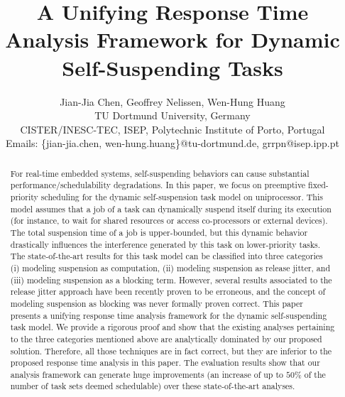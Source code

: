 \documentclass[conference]{IEEEtran}
\begin{document}
  
\title{A Unifying Response Time Analysis Framework for Dynamic Self-Suspending Tasks}

\author{Jian-Jia Chen, Geoffrey Nelissen, Wen-Hung Huang\\
 TU Dortmund University, Germany\\
 CISTER/INESC-TEC, ISEP, Polytechnic Institute of Porto, Portugal \\
Emails: \{jian-jia.chen, wen-hung.huang\}@tu-dortmund.de, grrpn@isep.ipp.pt
}

\maketitle

\begin{abstract}
  For real-time embedded systems, self-suspending behaviors can cause
  substantial performance/schedulability degradations. In this paper,
  we focus on preemptive fixed-priority scheduling for the dynamic
  self-suspension task model on uniprocessor. This
  model assumes that a job of a task can dynamically suspend itself during its execution (for instance, to wait for shared resources or access co-processors or external devices).
  The total suspension time of a job is upper-bounded, but this dynamic behavior drastically influences the interference generated by this task on lower-priority tasks. The state-of-the-art results for this task model can be classified
  into three categories (i) modeling suspension as computation, (ii)
  modeling suspension as release jitter, and (iii) modeling suspension as a blocking term.
  However, several results associated to the release jitter approach have been recently proven to be erroneous, and the concept of modeling suspension as blocking was never
  formally proven correct. This paper presents a unifying
  response time analysis framework for the dynamic self-suspending
  task model. We provide a rigorous proof and show that the existing analyses pertaining to the three categories mentioned above are analytically dominated by our proposed solution. Therefore, all those techniques are in fact correct, but they are
  inferior to the proposed response time analysis in this paper. The
  evaluation results show that our analysis framework can generate huge
  improvements (an increase of up to $50\%$ of the number of task sets
  deemed schedulable) over these state-of-the-art analyses.
\end{abstract}
\end{document}

